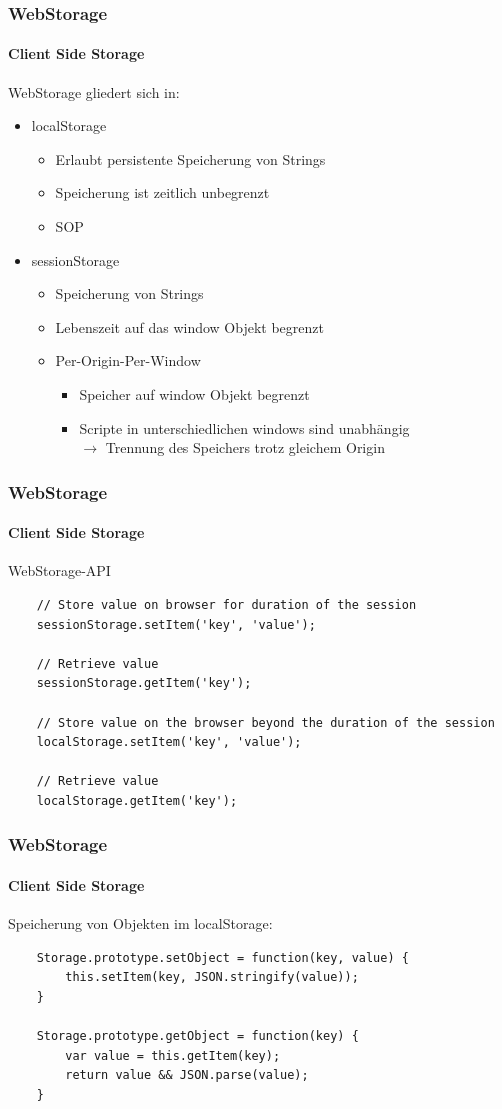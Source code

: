 \begin{frame}
\frametitle{WebStorage}
\framesubtitle{Client Side Storage}
	WebStorage gliedert sich in:
	\begin{itemize}
		\item localStorage
		\begin{itemize}
			\item Erlaubt persistente Speicherung von Strings
			\item Speicherung ist zeitlich unbegrenzt
			\item SOP
		\end{itemize}
		\item sessionStorage
		\begin{itemize}
			\item Speicherung von Strings
			\item Lebenszeit auf das window Objekt begrenzt 
			\item Per-Origin-Per-Window
			\begin{itemize}
				\item Speicher auf window Objekt begrenzt
				\item Scripte in unterschiedlichen windows sind unabhängig \\
				$\rightarrow$ Trennung des Speichers trotz gleichem Origin	
			\end{itemize}
		\end{itemize}
	\end{itemize}
\end{frame}
\begin{frame}[fragile]
\frametitle{WebStorage}
\framesubtitle{Client Side Storage}
	WebStorage-API
	\begin{lstlisting}
	// Store value on browser for duration of the session
	sessionStorage.setItem('key', 'value');
		
	// Retrieve value 
	sessionStorage.getItem('key');
		
	// Store value on the browser beyond the duration of the session
	localStorage.setItem('key', 'value');
		
	// Retrieve value 
	localStorage.getItem('key');	
	\end{lstlisting}
\end{frame}
\begin{frame}[fragile]
\frametitle{WebStorage}
\framesubtitle{Client Side Storage}
	Speicherung von Objekten im localStorage:
	\begin{lstlisting}
	Storage.prototype.setObject = function(key, value) {
	    this.setItem(key, JSON.stringify(value));
	}
		
	Storage.prototype.getObject = function(key) {
	    var value = this.getItem(key);
		return value && JSON.parse(value);
	}
	\end{lstlisting}
\end{frame}
